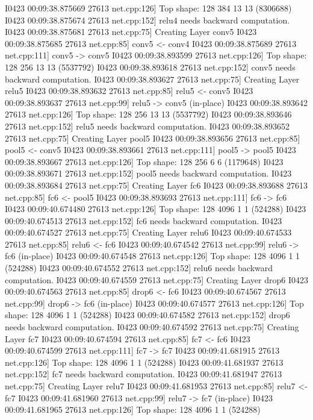 \documentclass{article}
\begin{document}
I0423 00:09:38.875669 27613 net.cpp:126] Top shape: 128 384 13 13 (8306688)
I0423 00:09:38.875674 27613 net.cpp:152] relu4 needs backward computation.
I0423 00:09:38.875681 27613 net.cpp:75] Creating Layer conv5
I0423 00:09:38.875685 27613 net.cpp:85] conv5 <- conv4
I0423 00:09:38.875689 27613 net.cpp:111] conv5 -> conv5
I0423 00:09:38.893599 27613 net.cpp:126] Top shape: 128 256 13 13 (5537792)
I0423 00:09:38.893618 27613 net.cpp:152] conv5 needs backward computation.
I0423 00:09:38.893627 27613 net.cpp:75] Creating Layer relu5
I0423 00:09:38.893632 27613 net.cpp:85] relu5 <- conv5
I0423 00:09:38.893637 27613 net.cpp:99] relu5 -> conv5 (in-place)
I0423 00:09:38.893642 27613 net.cpp:126] Top shape: 128 256 13 13 (5537792)
I0423 00:09:38.893646 27613 net.cpp:152] relu5 needs backward computation.
I0423 00:09:38.893652 27613 net.cpp:75] Creating Layer pool5
I0423 00:09:38.893656 27613 net.cpp:85] pool5 <- conv5
I0423 00:09:38.893661 27613 net.cpp:111] pool5 -> pool5
I0423 00:09:38.893667 27613 net.cpp:126] Top shape: 128 256 6 6 (1179648)
I0423 00:09:38.893671 27613 net.cpp:152] pool5 needs backward computation.
I0423 00:09:38.893684 27613 net.cpp:75] Creating Layer fc6
I0423 00:09:38.893688 27613 net.cpp:85] fc6 <- pool5
I0423 00:09:38.893693 27613 net.cpp:111] fc6 -> fc6
I0423 00:09:40.674480 27613 net.cpp:126] Top shape: 128 4096 1 1 (524288)
I0423 00:09:40.674513 27613 net.cpp:152] fc6 needs backward computation.
I0423 00:09:40.674527 27613 net.cpp:75] Creating Layer relu6
I0423 00:09:40.674533 27613 net.cpp:85] relu6 <- fc6
I0423 00:09:40.674542 27613 net.cpp:99] relu6 -> fc6 (in-place)
I0423 00:09:40.674548 27613 net.cpp:126] Top shape: 128 4096 1 1 (524288)
I0423 00:09:40.674552 27613 net.cpp:152] relu6 needs backward computation.
I0423 00:09:40.674559 27613 net.cpp:75] Creating Layer drop6
I0423 00:09:40.674563 27613 net.cpp:85] drop6 <- fc6
I0423 00:09:40.674567 27613 net.cpp:99] drop6 -> fc6 (in-place)
I0423 00:09:40.674577 27613 net.cpp:126] Top shape: 128 4096 1 1 (524288)
I0423 00:09:40.674582 27613 net.cpp:152] drop6 needs backward computation.
I0423 00:09:40.674592 27613 net.cpp:75] Creating Layer fc7
I0423 00:09:40.674594 27613 net.cpp:85] fc7 <- fc6
I0423 00:09:40.674599 27613 net.cpp:111] fc7 -> fc7
I0423 00:09:41.681915 27613 net.cpp:126] Top shape: 128 4096 1 1 (524288)
I0423 00:09:41.681937 27613 net.cpp:152] fc7 needs backward computation.
I0423 00:09:41.681947 27613 net.cpp:75] Creating Layer relu7
I0423 00:09:41.681953 27613 net.cpp:85] relu7 <- fc7
I0423 00:09:41.681960 27613 net.cpp:99] relu7 -> fc7 (in-place)
I0423 00:09:41.681965 27613 net.cpp:126] Top shape: 128 4096 1 1 (524288)
\end{document}
